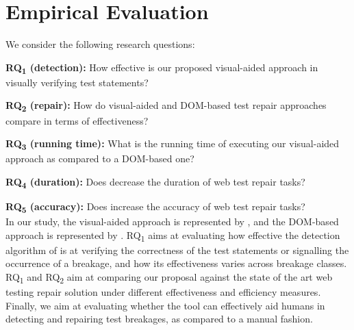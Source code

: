 
\section{Empirical Evaluation}\label{sec:evaluation}

We consider the following research questions:

\noindent
\textbf{RQ\textsubscript{1} (detection):} How effective is our proposed visual-aided approach in visually verifying test statements?

\noindent
\textbf{RQ\textsubscript{2} (repair):} How do visual-aided and DOM-based test repair approaches compare in terms of effectiveness?

\noindent
\textbf{RQ\textsubscript{3} (running time):} What is the running time of executing our visual-aided approach as compared to a DOM-based one?

\noindent
\textbf{RQ\textsubscript{4} (duration):} Does \tool decrease the duration of web test repair tasks?

\noindent
\textbf{RQ\textsubscript{5} (accuracy):} Does \tool increase the accuracy of web test repair tasks? \\

\noindent
In our study, the visual-aided approach is represented by \tool, and the DOM-based approach is represented by \water. RQ\textsubscript{1} aims at evaluating how effective the detection algorithm of \tool is at verifying the correctness of the test statements or signalling the occurrence of a breakage, and how its effectiveness varies across breakage classes. RQ\textsubscript{1} and RQ\textsubscript{2} aim at comparing our proposal against the state of the art web testing repair solution under different effectiveness and efficiency measures. Finally, we aim at evaluating whether the tool can effectively aid humans in detecting and repairing test breakages, as compared to a manual fashion.

